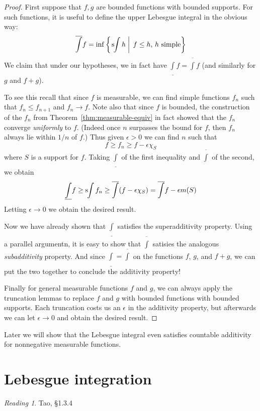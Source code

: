 \documentclass[11pt,oneside]{amsbook}
\newcommand{\sint}{\text{s}\kern-3pt\int}
\newcommand{\lint}{\underline\int}
\newcommand{\ovint}{\overline\int}
\theoremstyle{definition}
\theoremstyle{plain}
\theoremstyle{definition}
\theoremstyle{remark}
\newtheorem*{reading}{Reading}
\numberwithin{equation}{section}
\numberwithin{figure}{section}
\begin{document}
\begin{proof}
  First suppose that $f,g$ are bounded functions with bounded supports. For such functions, it is useful to define the upper Lebesgue integral in the obvious way:
  \[\ovint f=\inf\left\{\left.\sint h\;\right|\;f\leq h\text{, $h$ simple}\right\}
  \]
  We claim that under our hypotheses, we in fact have $\lint f=\ovint f$ (and similarly for $g$ and $f+g$).

  To see this recall that since $f$ is measurable, we can find simple functions $f_n$ such that $f_n\leq f_{n+1}$ and $f_n\to f$. Note also that since $f$ is bounded, the construction of the $f_n$ from Theorem~\ref{thm:measurable-equiv} in fact showed that the $f_n$ converge \emph{uniformly} to $f$. (Indeed once $n$ surpasses the bound for $f$, then $f_n$ always lie within $1/n$ of $f$.) Thus given $\epsilon>0$ we can find $n$ such that
  \[f\geq f_n\geq f-\epsilon\chi_S
  \]
  where $S$ is a support for $f$. Taking $\lint$ of the first inequality and $\ovint$ of the second, we obtain
  \[\lint f\geq\sint f_n\geq\ovint(f-\epsilon\chi_S)=\ovint f-\epsilon m(S)
  \]
  Letting $\epsilon\to0$ we obtain the desired result.

  Now we have already shown that $\lint$ satisfies the superadditivity property. Using a parallel argumentn, it is easy to show that $\ovint$ satisies the analogous \emph{subadditivity} property. And since $\lint=\ovint$ on the functions $f$, $g$, and $f+g$, we can put the two together to conclude the additivity property!

  Finally for general measurable functions $f$ and $g$, we can always apply the truncation lemmas to replace $f$ and $g$ with bounded functions with bounded supports. Each truncation costs us an $\epsilon$ in the additivity property, but afterwards we can let $\epsilon\to0$ and obtain the desired result.
\end{proof}

Later we will show that the Lebesgue integral even satisfies countable additivity for nonnegative measurable functions.


\section{Lebesgue integration}

\begin{reading}
  Tao, \S 1.3.4
\end{reading}
\end{document}
